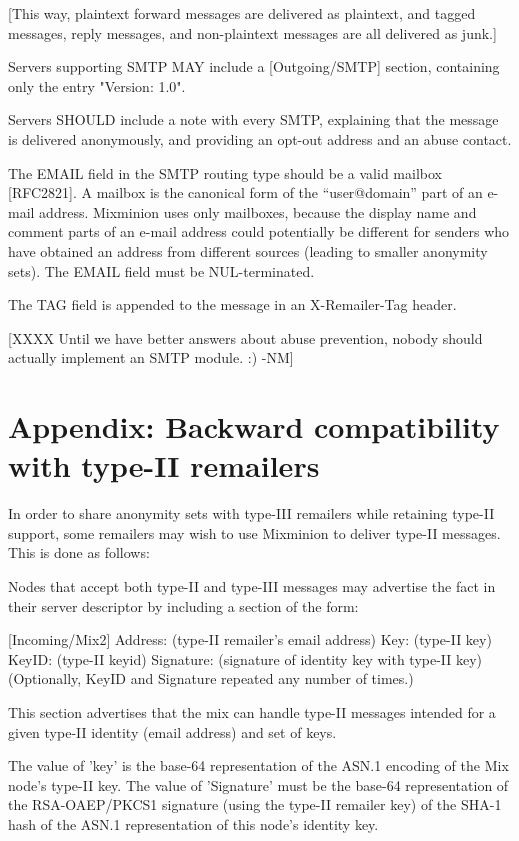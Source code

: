[This way, plaintext forward messages are delivered as plaintext,
and tagged messages, reply messages, and non-plaintext messages are
all delivered as junk.]

Servers supporting SMTP MAY include a [Outgoing/SMTP] section,
containing only the entry "Version: 1.0".

Servers SHOULD include a note with every SMTP, explaining that the
message is delivered anonymously, and providing an opt-out address and
an abuse contact.

The EMAIL field in the SMTP routing type should be a valid mailbox
[RFC2821]. A mailbox is the canonical form of the ``user@domain''
part of an e-mail address. Mixminion uses only mailboxes, because the
display name and comment parts of an e-mail address could potentially be
different for senders who have obtained an address from different
sources (leading to smaller anonymity sets). The EMAIL field must be
NUL-terminated.

The TAG field is appended to the message in an X-Remailer-Tag header.

[XXXX Until we have better answers about abuse prevention, nobody should
  actually implement an SMTP module. :) -NM]

\section{Appendix: Backward compatibility with type-II remailers}

In order to share anonymity sets with type-III remailers while
retaining type-II support, some remailers may wish to use Mixminion to
deliver type-II messages.  This is done as follows:

Nodes that accept both type-II and type-III messages may advertise the
fact in their server descriptor by including a section of the form:
 
         [Incoming/Mix2]
         Address: (type-II remailer's email address)
         Key: (type-II key)
	 KeyID: (type-II keyid)
         Signature: (signature of identity key with type-II key)
	 (Optionally, KeyID and Signature repeated any number of
                      times.)

This section advertises that the mix can handle type-II messages
intended for a given type-II identity (email address) and set of keys.

The value of 'key' is the base-64 representation of the ASN.1 encoding
of the Mix node's type-II key. The value of 'Signature' must be the
base-64 representation of the RSA-OAEP/PKCS1 signature (using the
type-II remailer key) of the SHA-1 hash of the ASN.1 representation of
this node's identity key.

